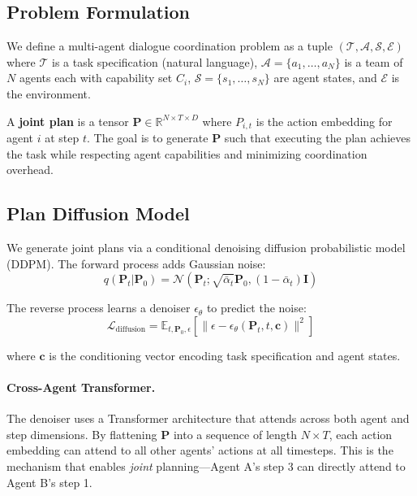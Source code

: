 \documentclass[11pt]{article}
\newcommand{\R}{\mathbb{R}}
\newcommand{\E}{\mathbb{E}}
\begin{document}
\subsection{Problem Formulation}

We define a multi-agent dialogue coordination problem as a tuple $(\mathcal{T}, \mathcal{A}, \mathcal{S}, \mathcal{E})$ where $\mathcal{T}$ is a task specification (natural language), $\mathcal{A} = \{a_1, \ldots, a_N\}$ is a team of $N$ agents each with capability set $C_i$, $\mathcal{S} = \{s_1, \ldots, s_N\}$ are agent states, and $\mathcal{E}$ is the environment.

A \textbf{joint plan} is a tensor $\mathbf{P} \in \R^{N \times T \times D}$ where $P_{i,t}$ is the action embedding for agent $i$ at step $t$. The goal is to generate $\mathbf{P}$ such that executing the plan achieves the task while respecting agent capabilities and minimizing coordination overhead.

\subsection{Plan Diffusion Model}

We generate joint plans via a conditional denoising diffusion probabilistic model (DDPM). The forward process adds Gaussian noise:
\begin{equation}
    q(\mathbf{P}_t | \mathbf{P}_0) = \mathcal{N}(\mathbf{P}_t; \sqrt{\bar\alpha_t}\mathbf{P}_0, (1-\bar\alpha_t)\mathbf{I})
\end{equation}

The reverse process learns a denoiser $\epsilon_\theta$ to predict the noise:
\begin{equation}
    \mathcal{L}_\text{diffusion} = \E_{t, \mathbf{P}_0, \epsilon}\left[\|\epsilon - \epsilon_\theta(\mathbf{P}_t, t, \mathbf{c})\|^2\right]
\end{equation}

where $\mathbf{c}$ is the conditioning vector encoding task specification and agent states.

\paragraph{Cross-Agent Transformer.} The denoiser uses a Transformer architecture that attends across both agent and step dimensions. By flattening $\mathbf{P}$ into a sequence of length $N \times T$, each action embedding can attend to all other agents' actions at all timesteps. This is the mechanism that enables \textit{joint} planning---Agent A's step 3 can directly attend to Agent B's step 1.
\end{document}
